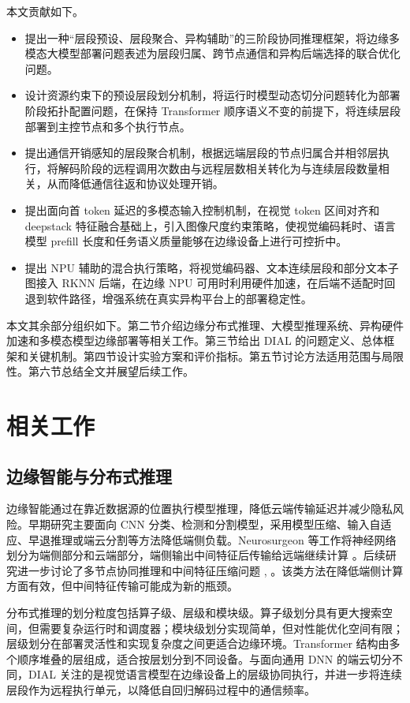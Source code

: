 \documentclass[10pt,a4paper,twocolumn]{ctexart}
\begin{document}
本文贡献如下。

\begin{itemize}
\setlength{\itemsep}{0.12em}
\setlength{\parsep}{0pt}
\setlength{\topsep}{0.25em}
\item 提出一种“层段预设、层段聚合、异构辅助”的三阶段协同推理框架，将边缘多模态大模型部署问题表述为层段归属、跨节点通信和异构后端选择的联合优化问题。
\item 设计资源约束下的预设层段划分机制，将运行时模型动态切分问题转化为部署阶段拓扑配置问题，在保持 Transformer 顺序语义不变的前提下，将连续层段部署到主控节点和多个执行节点。
\item 提出通信开销感知的层段聚合机制，根据远端层段的节点归属合并相邻层执行，将解码阶段的远程调用次数由与远程层数相关转化为与连续层段数量相关，从而降低通信往返和协议处理开销。
\item 提出面向首 token 延迟的多模态输入控制机制，在视觉 token 区间对齐和 deepstack 特征融合基础上，引入图像尺度约束策略，使视觉编码耗时、语言模型 prefill 长度和任务语义质量能够在边缘设备上进行可控折中。
\item 提出 NPU 辅助的混合执行策略，将视觉编码器、文本连续层段和部分文本子图接入 RKNN 后端，在边缘 NPU 可用时利用硬件加速，在后端不适配时回退到软件路径，增强系统在真实异构平台上的部署稳定性。
\end{itemize}

本文其余部分组织如下。第二节介绍边缘分布式推理、大模型推理系统、异构硬件加速和多模态模型边缘部署等相关工作。第三节给出 DIAL 的问题定义、总体框架和关键机制。第四节设计实验方案和评价指标。第五节讨论方法适用范围与局限性。第六节总结全文并展望后续工作。

\section{相关工作}

\subsection{边缘智能与分布式推理}

边缘智能通过在靠近数据源的位置执行模型推理，降低云端传输延迟并减少隐私风险。早期研究主要面向 CNN 分类、检测和分割模型，采用模型压缩、输入自适应、早退推理或端云分割等方法降低端侧负载。Neurosurgeon 等工作将神经网络划分为端侧部分和云端部分，端侧输出中间特征后传输给远端继续计算 \cite{ref1}。后续研究进一步讨论了多节点协同推理和中间特征压缩问题 \cite{ref2}, \cite{ref3}。该类方法在降低端侧计算方面有效，但中间特征传输可能成为新的瓶颈。

分布式推理的划分粒度包括算子级、层级和模块级。算子级划分具有更大搜索空间，但需要复杂运行时和调度器；模块级划分实现简单，但对性能优化空间有限；层级划分在部署灵活性和实现复杂度之间更适合边缘环境。Transformer 结构由多个顺序堆叠的层组成，适合按层划分到不同设备。与面向通用 DNN 的端云切分不同，DIAL 关注的是视觉语言模型在边缘设备上的层级协同执行，并进一步将连续层段作为远程执行单元，以降低自回归解码过程中的通信频率。
\end{document}
